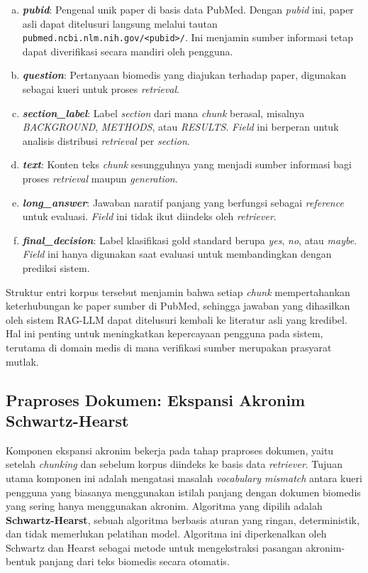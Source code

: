\begin{enumerate}[a.]
    \item \textbf{\textit{pubid}}: Pengenal unik paper di basis data PubMed. Dengan \textit{pubid} ini, paper asli dapat ditelusuri langsung melalui tautan \texttt{pubmed.ncbi.nlm.nih.gov/<pubid>/}. Ini menjamin sumber informasi tetap dapat diverifikasi secara mandiri oleh pengguna.
    \item \textbf{\textit{question}}: Pertanyaan biomedis yang diajukan terhadap paper, digunakan sebagai kueri untuk proses \textit{retrieval}.
    \item \textbf{\textit{section\_label}}: Label \textit{section} dari mana \textit{chunk} berasal, misalnya \textit{BACKGROUND}, \textit{METHODS}, atau \textit{RESULTS}. \textit{Field} ini berperan untuk analisis distribusi \textit{retrieval} per \textit{section}.
    \item \textbf{\textit{text}}: Konten teks \textit{chunk} sesungguhnya yang menjadi sumber informasi bagi proses \textit{retrieval} maupun \textit{generation}.
    \item \textbf{\textit{long\_answer}}: Jawaban naratif panjang yang berfungsi sebagai \textit{reference} untuk evaluasi. \textit{Field} ini tidak ikut diindeks oleh \textit{retriever}.
    \item \textbf{\textit{final\_decision}}: Label klasifikasi gold standard berupa \textit{yes}, \textit{no}, atau \textit{maybe}. \textit{Field} ini hanya digunakan saat evaluasi untuk membandingkan dengan prediksi sistem.
\end{enumerate}

Struktur entri korpus tersebut menjamin bahwa setiap \textit{chunk} mempertahankan keterhubungan ke paper sumber di PubMed, sehingga jawaban yang dihasilkan oleh sistem RAG-LLM dapat ditelusuri kembali ke literatur asli yang kredibel. Hal ini penting untuk meningkatkan kepercayaan pengguna pada sistem, terutama di domain medis di mana verifikasi sumber merupakan prasyarat mutlak.

\subsection{Praproses Dokumen: Ekspansi Akronim Schwartz-Hearst}
\label{subsec:ekspansi-akronim}

Komponen ekspansi akronim bekerja pada tahap praproses dokumen, yaitu setelah \textit{chunking} dan sebelum korpus diindeks ke basis data \textit{retriever}. Tujuan utama komponen ini adalah mengatasi masalah \textit{vocabulary mismatch} antara kueri pengguna yang biasanya menggunakan istilah panjang dengan dokumen biomedis yang sering hanya menggunakan akronim. Algoritma yang dipilih adalah \textbf{Schwartz-Hearst}, sebuah algoritma berbasis aturan yang ringan, deterministik, dan tidak memerlukan pelatihan model. Algoritma ini diperkenalkan oleh Schwartz dan Hearst sebagai metode untuk mengekstraksi pasangan akronim-bentuk panjang dari teks biomedis secara otomatis.

